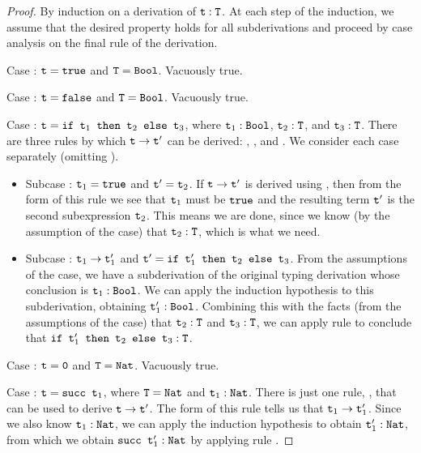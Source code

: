 \documentclass[11pt,twoside=off,numbers=noenddot]{scrbook}
\begin{document}
\begin{proof}
  By induction on a derivation of $\texttt{t} : \texttt{T}$. At each step
  of the induction, we assume that the desired property holds for all
  subderivations and proceed by case analysis on the final rule of
  the derivation.

  Case : $\texttt{t} = \texttt{true}$ and $\texttt{T} =
  \texttt{Bool}$. Vacuously true.

  Case : $\texttt{t} = \texttt{false}$ and $\texttt{T} =
  \texttt{Bool}$. Vacuously true.

  Case : $\texttt{t} = \texttt{if $\texttt{t}_1$ then $\texttt{t}_2$ else
  $\texttt{t}_3$}$, where $\texttt{t}_1 : \texttt{Bool}$,
  $\texttt{t}_2 : \texttt{T}$, and $\texttt{t}_3 : \texttt{T}$. There are three
  rules by which $\texttt{t} \rightarrow \texttt{t}'$ can be derived: ,
  , and . We consider each case separately
  (omitting ).
  \begin{itemize}
    \item Subcase : $\texttt{t}_1 = \texttt{true}$ and
      $\texttt{t}' = \texttt{t}_2$. If $\texttt{t} \rightarrow \texttt{t}'$ is
      derived using , then from the form of this rule
      we see that $\texttt{t}_1$ must be $\texttt{true}$ and the resulting
      term $\texttt{t}'$ is the second subexpression $\texttt{t}_2$. This
      means we are done, since we know (by the assumption of the
       case) that $\texttt{t}_2 : \texttt{T}$, which is what we need.
    \item Subcase : $\texttt{t}_1 \rightarrow
      \texttt{t}_1'$ and $\texttt{t}' = \texttt{if $\texttt{t}_1'$ then
      $\texttt{t}_2$ else $\texttt{t}_3$}$. From the assumptions of the
       case, we have a subderivation of the original typing
      derivation whose conclusion is $\texttt{t}_1 : \texttt{Bool}$. We can
      apply the induction hypothesis to this subderivation, obtaining
      $\texttt{t}_1' : \texttt{Bool}$. Combining this with the facts (from
      the assumptions of the  case) that $\texttt{t}_2 :
      \texttt{T}$ and $\texttt{t}_3 : \texttt{T}$, we can apply rule
       to conclude that $\texttt{if $\texttt{t}_1'$ then
      $\texttt{t}_2$ else $\texttt{t}_3$} : \texttt{T}$.
  \end{itemize}

  Case : $\texttt{t} = \texttt{0}$ and $\texttt{T} = \texttt{Nat}$.
  Vacuously true.

  Case : $\texttt{t} = \texttt{succ $\texttt{t}_1$}$, where
  $\texttt{T} = \texttt{Nat}$ and $\texttt{t}_1 : \texttt{Nat}$. There is just
  one rule, , that can be used to derive $\texttt{t}
  \rightarrow \texttt{t}'$. The form of this rule tells us that
  $\texttt{t}_1 \rightarrow \texttt{t}_1'$. Since we also know $\texttt{t}_1 :
  \texttt{Nat}$, we can apply the induction hypothesis to obtain
  $\texttt{t}_1' : \texttt{Nat}$, from which we obtain $\texttt{succ
  $\texttt{t}_1'$} : \texttt{Nat}$ by applying rule .


\end{proof}
\end{document}

